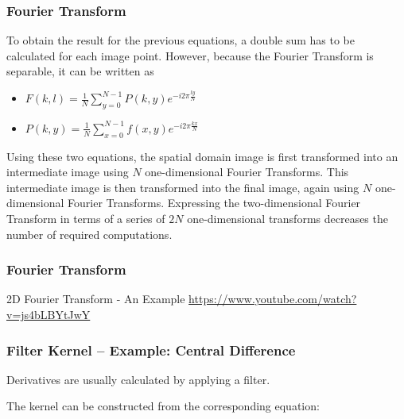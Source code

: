 \begin{frame}
    \frametitle{Fourier Transform}
    To obtain the result for the previous equations, a double sum has to be calculated for each image point. However, because the Fourier Transform is separable, it can be written as \newline

    \begin{itemize}
        \item $F(k,l) = \frac{1}{N}  \sum^{N-1}_{y=0}  P(k,y) e^{-i 2\pi \frac{ly}{N}}$ 
        \item $P(k,y) = \frac{1}{N}  \sum^{N-1}_{x=0}  f(x,y) e^{-i 2\pi \frac{kx}{N}}$
    \end{itemize}

Using these two equations, the spatial domain image is first transformed into an intermediate image using $N$ one-dimensional Fourier Transforms. This intermediate image is then transformed into the final image, again using $N$ one-dimensional Fourier Transforms. Expressing the two-dimensional Fourier Transform in terms of a series of $2N$ one-dimensional transforms decreases the number of required computations.

\end{frame}

\begin{frame}
    \frametitle{Fourier Transform}
    2D Fourier Transform - An Example
    \url{https://www.youtube.com/watch?v=js4bLBYtJwY}

\end{frame}

\begin{frame}
    \frametitle{Filter Kernel -- Example: Central Difference}
    Derivatives are usually calculated by applying a filter.
    \bigskip

    The kernel can be constructed from the corresponding equation:
    \bigskip

    \begin{center}
    \end{center}
\end{frame}

